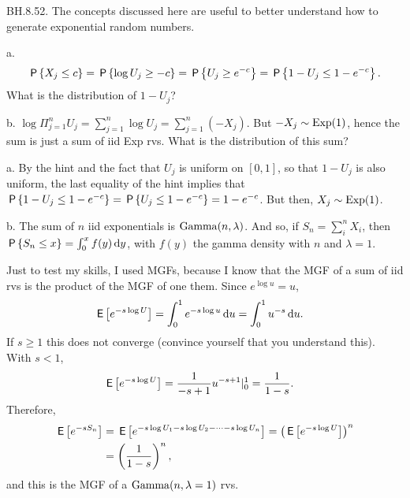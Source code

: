 \begin{exercise} BH.8.52. The concepts discussed here are useful to better understand how to generate exponential random numbers.
\begin{hint}
a.
\begin{align*}
\P{X_j\leq c} = \P{ \log U_{j} \geq -c} = \P{ U_{j} \geq e^{-c}} = \P{1-U_{j} \leq 1-e^{-c}}.
\end{align*}
What is the distribution of $1-U_{j}$?

b. $\log \Pi_{j=1}^{n} U_{j} = \sum_{j=1}^n \log U_j = \sum_{j=1}^n (-X_{j})$.  But $-X_j\sim \Exp{1}$, hence the sum is just a sum of iid Exp rvs. What is the distribution of this sum?

\end{hint}
\begin{solution}
a. By the  hint and  the fact that $U_j$ is uniform on $[0,1]$, so that $1-U_j$ is also uniform,  the last  equality of the hint implies  that
$\P{ 1-U_{j} \leq 1- e^{-c}} = \P{ U_{j} \leq 1-e^{-c}} =  1-e^{-c}$.
But then, $X_{j}\sim \Exp{1}$.

b. The sum of $n$ iid exponentials is $\Gamm{n, \lambda}$. And so, if $S_n=\sum_i^n X_{i}$, then $\P{S_n\leq x} = \int_{0}^{x}f(y) \d y$, with $f(y)$ the gamma density with $n$ and $\lambda=1$.

Just to test my skills, I used MGFs, because I know that the MGF of a sum of iid rvs is the product of the MGF of one them. Since $e^{\log u} = u$,
\begin{align*}
  \E{e^{-s \log U}} &= \int_{0}^1 e^{-s \log u}\d u = \int_{0}^{1} u^{-s}\d u.
\end{align*}
If $s\geq 1$ this does not converge (convince yourself that you understand this). With $s<1$,
\begin{align*}
  \E{e^{-s \log U}} &= \frac1 {-s+1} u^{-s+1}|_0^1 = \frac{1}{1-s}.
\end{align*}
Therefore,
\begin{align*}
  \E{e^{-s S_n}}
  &=  \E{e^{-s \log U_1 -s \log U_2 - \cdots -s \log U_n}}
  = \left(\E{e^{-s\log U}}\right)^n \\
  &= \left(\frac{1}{1-s}\right)^{n},
\end{align*}
and this is the MGF of a $\Gamm{n, \lambda=1}$ rvs.
\end{solution}
\end{exercise}

